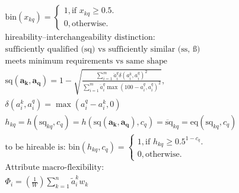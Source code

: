 \documentclass{article}
\begin{document}
\begin{gather}
    \text{bin}(x_{kq}) = 
    \begin{cases}
        1, \text{if } x_{kq} \geq 0.5.\\
        0, \text{otherwise.}
    \end{cases}\\
    \text{hireability--interchangeability distinction:}\\
    \text{sufficiently qualified (sq) vs sufficiently similar (ss, \ss)}\\
    \text{meets minimum requirements vs same shape}\\
    \text{sq}(\boldsymbol{a_k},\boldsymbol{a_q}) = 
    1 - 
    \sqrt{
        \frac{
            \sum_{i=1}^{m}{
                \ddot{a}_{i}^{q}
                \delta(
                    {a}_{i}^{k},
                    {a}_{i}^{q}
                ) ^ 2
            }
        }{
            \sum_{i=1}^{m}{
                \ddot{a}_{i}^{q}
                \max(
                    100 - {a}_{i}^{q}, 
                    {a}_{i}^{q}
                ) ^ 2
            }
        }
    },\\
    \delta({a}_{i}^{k}, {a}_{i}^{q}) = 
    \max({a}_{i}^{q} - {a}_{i}^{k}, 0)\\
    h_{kq}
    = h(\text{sq}_{kq},c_{q})
    = h(\text{sq}(\boldsymbol{a_k},\boldsymbol{a_q}),c_{q}) 
    = \ddot{\text{sq}}_{kq}
    = \text{eq}\left(
        \text{sq}_{kq},
        c_{q}
    \right)\\
    \text{to be hireable is: }
    \text{bin}(h_{kq}, c_{q}) = 
    \begin{cases}
        1, \text{if } h_{kq} \geq 0.5 ^ {1 - c_{q}}.\\
        0, \text{otherwise}.
    \end{cases}\\
    \text{Attribute macro-flexibility:}\\
    \Phi_{i} = 
    \left(\frac{1}{W}\right)
    \sum_{k=1}^{n}{
        \tilde{a}_{i}^{k}
        w_{k}
    }
\end{gather}
\end{document}
